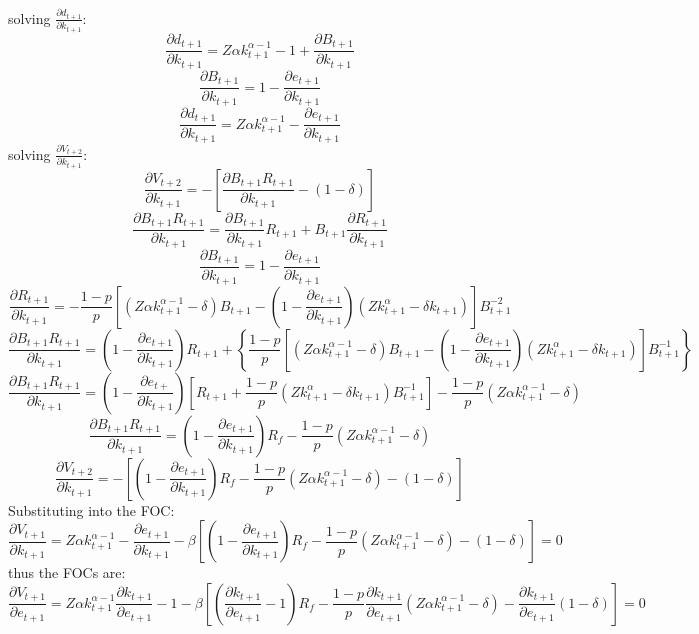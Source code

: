 \documentclass[12pt]{article}
\begin{document}
solving \(\frac{\partial d_{t+1}}{\partial k_{t+1}}\):
\[\frac{\partial d_{t+1}}{\partial k_{t+1}} = Z \alpha k_{t+1} ^{\alpha-1} - 1 + \frac{\partial B_{t+1}}{\partial
k_{t+1}} \]
\[\frac{\partial B_{t+1}}{\partial
k_{t+1}} = 1 - \frac{\partial e_{t+1}}{\partial k_{t+1}} \]
\[\frac{\partial d_{t+1}}{\partial k_{t+1}} = Z \alpha k_{t+1} ^{\alpha-1} - \frac{\partial e_{t+1}}{\partial
k_{t+1}}\]
solving \(\frac{\partial V_{t+2}}{\partial k_{t+1}}\):
\[\frac{\partial V_{t+2}}{\partial k_{t+1}} = -\left[\frac{\partial B_{t+1}R_{t+1}}{\partial k_{t+1}} -(1-\delta)\right] \]
\[\frac{\partial B_{t+1}R_{t+1}}{\partial k_{t+1}} = \frac{\partial B_{t+1}}{\partial k_{t+1}}R_{t+1} +
B_{t+1}\frac{\partial R_{t+1}}{\partial k_{t+1}}\]
\[\frac{\partial B_{t+1}}{\partial k_{t+1}} = 1-\frac{\partial e_{t+1}}{\partial k_{t+1}} \]
\[\frac{\partial R_{t+1}}{\partial k_{t+1}} =  - \frac{1-p}{p}\left[\left(Z\alpha k^{\alpha-1}_{t+1}-\delta\right)B_{t+1} -
\left(1-\frac{\partial e_{t+1}}{\partial k_{t+1}}\right)\left(Zk_{t+1}^{\alpha} - \delta k_{t+1}
\right)\right]B_{t+1}^{-2} 
\]
\[\frac{\partial B_{t+1}R_{t+1}}{\partial k_{t+1}} = \left(1-\frac{\partial e_{t+1}}{\partial k_{t+1}}\right) R_{t+1} +
\left\{\frac{1-p}{p}\left[(Z \alpha k^{\alpha-1}_{t+1}-\delta)B_{t+1} -
\left(1-\frac{\partial e_{t+1}}{\partial k_{t+1}}\right)\left(Zk_{t+1}^{\alpha} - \delta k_{t+1}
\right)\right]B_{t+1}^{-1} \right\}\]
\[\frac{\partial B_{t+1}R_{t+1}}{\partial k_{t+1}} =\left(1-\frac{\partial e_{t+}}{\partial k_{t+1}}\right)
\left[R_{t+1} + \frac{1-p}{p}\left(Z k_{t+1}^{\alpha} - \delta k_{t+1}\right)B_{t+1}^{-1}\right]-
\frac{1-p}{p}\left(Z\alpha k^{\alpha-1}_{t+1}-\delta\right) \]
\[\frac{\partial B_{t+1}R_{t+1}}{\partial k_{t+1}} =\left(1-\frac{\partial e_{t+1}}{\partial k_{t+1}}\right)
R_f - \frac{1-p}{p}\left(Z\alpha k^{\alpha-1}_{t+1}-\delta\right) \]
\[\frac{\partial V_{t+2}}{\partial k_{t+1}} = -\left[\left(1-\frac{\partial e_{t+1}}{\partial k_{t+1}}\right)
R_f - \frac{1-p}{p}\left(Z\alpha k^{\alpha-1}_{t+1}-\delta\right)- \left(1-\delta\right)\right] \]
Substituting into the FOC:
\[\frac{\partial V_{t+1}}{\partial k_{t+1}} =Z \alpha k_{t+1} ^{\alpha-1} - \frac{\partial e_{t+1}}{\partial
k_{t+1}} - \beta \left[\left(1-\frac{\partial e_{t+1}}{\partial k_{t+1}}\right)
R_f - \frac{1-p}{p}\left(Z\alpha k^{\alpha-1}_{t+1}-\delta\right)- \left(1-\delta\right)\right]=0\]
thus the FOCs are:
\[\frac{\partial V_{t+1}}{\partial e_{t+1}} = Z \alpha k_{t+1} ^{\alpha-1}\frac{\partial k_{t+1}}{\partial e_{t+1}}  - 1 - \beta 
\left[\left(\frac{\partial k_{t+1}}{\partial e_{t+1}} -1 
\right)R_f-
\frac{1-p}{p}\frac{\partial k_{t+1}}{\partial e_{t+1}} \left(Z\alpha k^{\alpha-1}_{t+1} - \delta\right) - \frac{\partial
k_{t+1}}{\partial e_{t+1}} \left( 1-\delta \right)\right] = 0\]
\end{document}
